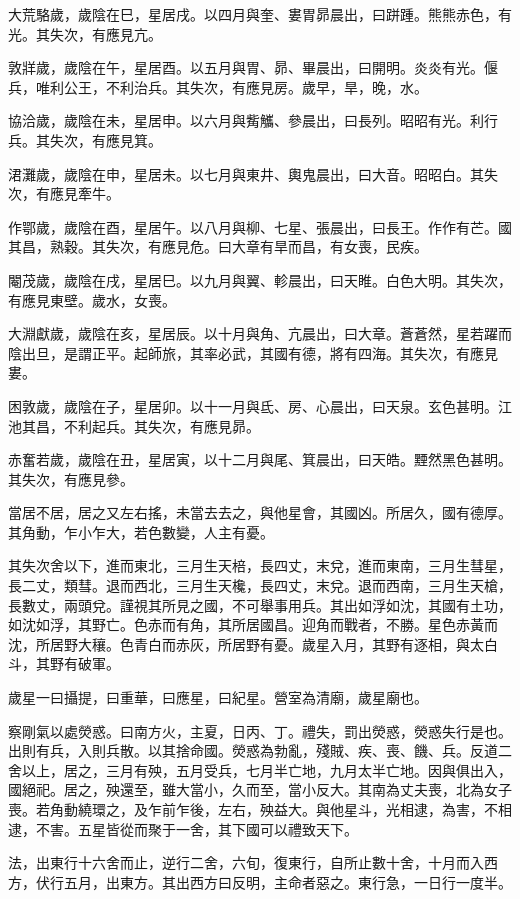 大荒駱歲，歲陰在巳，星居戌。以四月與奎、婁胃昴晨出，曰跰踵。熊熊赤色，有光。其失次，有應見亢。

敦牂歲，歲陰在午，星居酉。以五月與胃、昴、畢晨出，曰開明。炎炎有光。偃兵，唯利公王，不利治兵。其失次，有應見房。歲早，旱，晚，水。

協洽歲，歲陰在未，星居申。以六月與觜觿、參晨出，曰長列。昭昭有光。利行兵。其失次，有應見箕。

涒灘歲，歲陰在申，星居未。以七月與東井、輿鬼晨出，曰大音。昭昭白。其失次，有應見牽牛。

作鄂歲，歲陰在酉，星居午。以八月與柳、七星、張晨出，曰長王。作作有芒。國其昌，熟穀。其失次，有應見危。曰大章有旱而昌，有女喪，民疾。

閹茂歲，歲陰在戌，星居巳。以九月與翼、軫晨出，曰天睢。白色大明。其失次，有應見東壁。歲水，女喪。

大淵獻歲，歲陰在亥，星居辰。以十月與角、亢晨出，曰大章。蒼蒼然，星若躍而陰出旦，是謂正平。起師旅，其率必武，其國有德，將有四海。其失次，有應見婁。

困敦歲，歲陰在子，星居卯。以十一月與氐、房、心晨出，曰天泉。玄色甚明。江池其昌，不利起兵。其失次，有應見昴。

赤奮若歲，歲陰在丑，星居寅，以十二月與尾、箕晨出，曰天皓。黫然黑色甚明。其失次，有應見參。

當居不居，居之又左右搖，未當去去之，與他星會，其國凶。所居久，國有德厚。其角動，乍小乍大，若色數變，人主有憂。

其失次舍以下，進而東北，三月生天棓，長四丈，末兌，進而東南，三月生彗星，長二丈，類彗。退而西北，三月生天欃，長四丈，末兌。退而西南，三月生天槍，長數丈，兩頭兌。謹視其所見之國，不可舉事用兵。其出如浮如沈，其國有土功，如沈如浮，其野亡。色赤而有角，其所居國昌。迎角而戰者，不勝。星色赤黃而沈，所居野大穰。色青白而赤灰，所居野有憂。歲星入月，其野有逐相，與太白斗，其野有破軍。

歲星一曰攝提，曰重華，曰應星，曰紀星。營室為清廟，歲星廟也。

察剛氣以處熒惑。曰南方火，主夏，日丙、丁。禮失，罰出熒惑，熒惑失行是也。出則有兵，入則兵散。以其捨命國。熒惑為勃亂，殘賊、疾、喪、饑、兵。反道二舍以上，居之，三月有殃，五月受兵，七月半亡地，九月太半亡地。因與俱出入，國絕祀。居之，殃還至，雖大當小，久而至，當小反大。其南為丈夫喪，北為女子喪。若角動繞環之，及乍前乍後，左右，殃益大。與他星斗，光相逮，為害，不相逮，不害。五星皆從而聚于一舍，其下國可以禮致天下。

法，出東行十六舍而止，逆行二舍，六旬，復東行，自所止數十舍，十月而入西方，伏行五月，出東方。其出西方曰反明，主命者惡之。東行急，一日行一度半。

